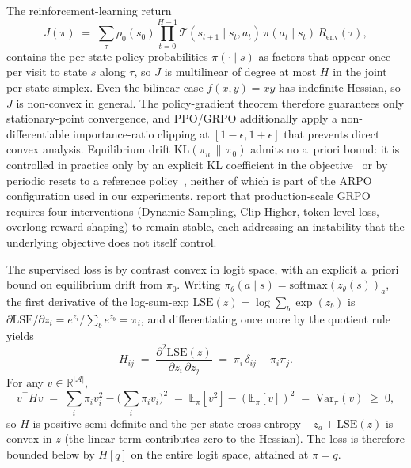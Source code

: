 \documentclass[11pt]{article}
\begin{document}
The reinforcement-learning return
\[
    J(\pi)
    \;=\; \sum_\tau \rho_0(s_0)
        \prod_{t=0}^{H-1} \mathcal{T}(s_{t+1} \mid s_t, a_t)\,\pi(a_t \mid s_t)\,
        R_{\mathrm{env}}(\tau),
\]
contains the per-state policy probabilities $\pi(\cdot \mid s)$ as
factors that appear once per visit to state $s$ along $\tau$, so $J$ is
multilinear of degree at most $H$ in the joint per-state simplex. Even
the bilinear case $f(x, y) = xy$ has indefinite Hessian, so $J$ is
non-convex in general. The policy-gradient theorem therefore guarantees
only stationary-point convergence, and PPO/GRPO additionally apply a
non-differentiable importance-ratio clipping at $[1 - \epsilon, 1 +
\epsilon]$ that prevents direct convex analysis. Equilibrium drift
$\mathrm{KL}(\pi_n \,\|\, \pi_0)$ admits no a~priori bound: it is
controlled in practice only by an explicit KL coefficient in the
objective~\citep{schulman2017ppo} or by periodic resets to a reference
policy~\citep{liu2025prorl}, neither of which is part of the ARPO
configuration used in our experiments. \citet{yu2025dapo} report that
production-scale GRPO requires four interventions (Dynamic Sampling,
Clip-Higher, token-level loss, overlong reward shaping) to remain
stable, each addressing an instability that the underlying objective
does not itself control.

The supervised loss is by contrast convex in logit space, with an
explicit a~priori bound on equilibrium drift from $\pi_0$. Writing
$\pi_\theta(a \mid s) = \mathrm{softmax}(z_\theta(s))_a$, the first
derivative of the log-sum-exp $\mathrm{LSE}(z) = \log \sum_b \exp(z_b)$
is $\partial \mathrm{LSE}/\partial z_i = e^{z_i}/\sum_b e^{z_b} = \pi_i$,
and differentiating once more by the quotient rule yields
\[
    H_{ij}
    \;=\; \frac{\partial^2 \mathrm{LSE}(z)}{\partial z_i\, \partial z_j}
    \;=\; \pi_i\,\delta_{ij} - \pi_i \pi_j.
\]
For any $v \in \mathbb{R}^{|\mathcal{A}|}$,
\[
    v^\top H v
    \;=\; \sum_i \pi_i v_i^2 - \Big(\sum_i \pi_i v_i\Big)^2
    \;=\; \mathbb{E}_\pi[v^2] - (\mathbb{E}_\pi[v])^2
    \;=\; \mathrm{Var}_\pi(v) \;\ge\; 0,
\]
so $H$ is positive semi-definite and the per-state cross-entropy
$-z_a + \mathrm{LSE}(z)$ is convex in $z$ (the linear term contributes
zero to the Hessian). The loss is therefore bounded below by $H[q]$ on
the entire logit space, attained at $\pi = q$.
\end{document}
